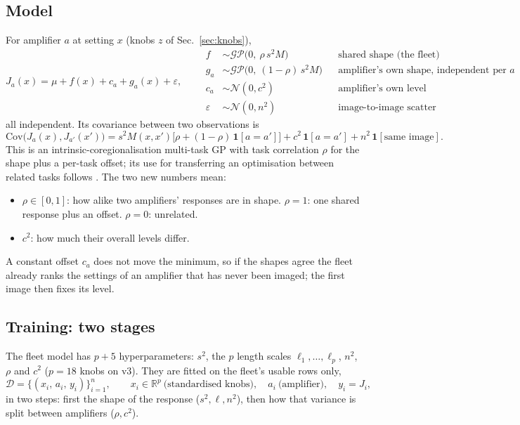 \documentclass[10pt,a4paper]{article}
\newcommand{\one}{\mathbf 1}
\begin{document}
\subsection{Model}
For amplifier $a$ at setting $x$ (knobs $z$ of Sec.~\ref{sec:knobs}),
\begin{equation}
J_a(x)=\mu+f(x)+c_a+g_a(x)+\varepsilon,
\qquad
\begin{aligned}
f&\sim\mathcal{GP}\big(0,\ \rho\,s^2M\big)&&\text{shared shape (the fleet)}\\
g_a&\sim\mathcal{GP}\big(0,\ (1-\rho)\,s^2M\big)&&\text{amplifier's own shape, independent per }a\\
c_a&\sim\mathcal N(0,c^2)&&\text{amplifier's own level}\\
\varepsilon&\sim\mathcal N(0,n^2)&&\text{image-to-image scatter}
\end{aligned}
\end{equation}
all independent. Its covariance between two observations is
\begin{equation}
\mathrm{Cov}\big(J_a(x),J_{a'}(x')\big)=s^2M(x,x')\big[\rho+(1-\rho)\,\one[a=a']\big]+c^2\,\one[a=a']+n^2\,\one[\text{same image}].
\label{eq:mtk}
\end{equation}
This is an intrinsic-coregionalisation multi-task GP \cite{bonilla2007} with task correlation $\rho$ for the shape plus a
per-task offset; its use for transferring an optimisation between related tasks follows \cite{swersky2013}. The two new
numbers mean:
\begin{itemize}
\item $\rho\in[0,1]$: how alike two amplifiers' responses are in shape. $\rho=1$: one shared response plus an offset.
  $\rho=0$: unrelated.
\item $c^2$: how much their overall levels differ.
\end{itemize}
A constant offset $c_a$ does not move the minimum, so if the shapes agree the fleet already ranks the settings of an
amplifier that has never been imaged; the first image then fixes its level.

\subsection{Training: two stages}
The fleet model has $p+5$ hyperparameters: $s^2$, the $p$ length scales $\ell_1,\dots,\ell_p$, $n^2$, $\rho$ and $c^2$ ($p=18$ knobs on v3).
They are fitted on the fleet's usable rows only,
\[
\mathcal D=\{(x_i,\,a_i,\,y_i)\}_{i=1}^{n},\qquad x_i\in\mathbb R^p\ \text{(standardised knobs)},\quad a_i\ \text{(amplifier)},\quad y_i=J_i,
\]
in two steps: first the shape of the response ($s^2,\ell,n^2$), then how that variance is split between amplifiers ($\rho,c^2$).
\end{document}

